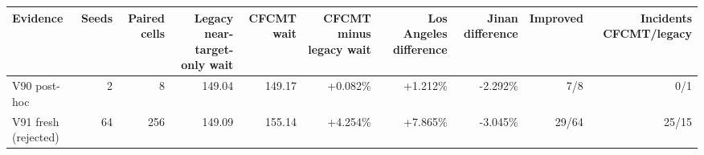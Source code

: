 \begin{tabular}{lrrrrrrrrr}
\toprule
Evidence & Seeds & Paired cells & Legacy near-target-only wait & CFCMT wait & CFCMT minus legacy wait & Los Angeles difference & Jinan difference & Improved & Incidents CFCMT/legacy \\
\midrule
V90 post-hoc & 2 & 8 & 149.04 & 149.17 & +0.082\% & +1.212\% & -2.292\% & 7/8 & 0/1 \\
V91 fresh (rejected) & 64 & 256 & 149.09 & 155.14 & +4.254\% & +7.865\% & -3.045\% & 29/64 & 25/15 \\
\bottomrule
\end{tabular}

